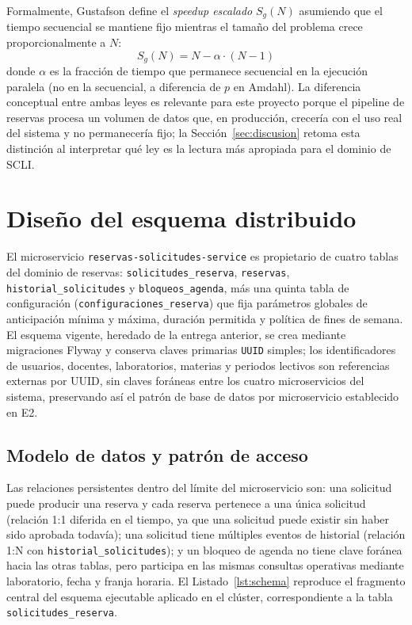 \documentclass[10pt,twocolumn]{article}
\begin{document}
Formalmente, Gustafson define el \emph{speedup escalado} $S_g(N)$ asumiendo
que el tiempo secuencial se mantiene fijo mientras el tamaño del problema
crece proporcionalmente a $N$:
\begin{equation}
S_g(N) = N - \alpha \cdot (N-1)
\label{eq:gustafson}
\end{equation}
donde $\alpha$ es la fracción de tiempo que permanece secuencial en la
ejecución paralela (no en la secuencial, a diferencia de $p$ en Amdahl). La
diferencia conceptual entre ambas leyes es relevante para este proyecto
porque el pipeline de reservas procesa un volumen de datos que, en
producción, crecería con el uso real del sistema y no permanecería fijo;
la Sección~\ref{sec:discusion} retoma esta distinción al interpretar qué
ley es la lectura más apropiada para el dominio de SCLI.

\section{Diseño del esquema distribuido}
\label{sec:esquema}

El microservicio \texttt{reservas-solicitudes-service} es propietario de
cuatro tablas del dominio de reservas: \texttt{solicitudes\_reserva},
\texttt{reservas}, \texttt{historial\_solicitudes} y
\texttt{bloqueos\_agenda}, más una quinta tabla de configuración
(\texttt{configuraciones\_reserva}) que fija parámetros globales de
anticipación mínima y máxima, duración permitida y política de fines de
semana. El esquema vigente, heredado de la entrega anterior, se crea
mediante migraciones Flyway y conserva claves primarias \texttt{UUID}
simples; los identificadores de usuarios, docentes, laboratorios, materias
y periodos lectivos son referencias externas por UUID, sin claves foráneas
entre los cuatro microservicios del sistema, preservando así el patrón de
base de datos por microservicio establecido en E2.

\subsection{Modelo de datos y patrón de acceso}
\label{sec:modelodatos}

Las relaciones persistentes dentro del límite del microservicio son: una
solicitud puede producir una reserva y cada reserva pertenece a una única
solicitud (relación 1:1 diferida en el tiempo, ya que una solicitud puede
existir sin haber sido aprobada todavía); una solicitud tiene múltiples
eventos de historial (relación 1:N con \texttt{historial\_solicitudes}); y
un bloqueo de agenda no tiene clave foránea hacia las otras tablas, pero
participa en las mismas consultas operativas mediante laboratorio, fecha y
franja horaria. El Listado~\ref{lst:schema} reproduce el fragmento
central del esquema ejecutable aplicado en el clúster, correspondiente a la
tabla \texttt{solicitudes\_reserva}.
\end{document}
